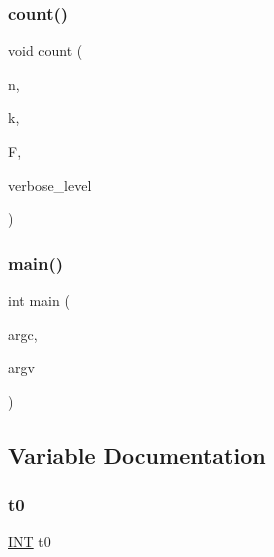 \subsubsection{\texorpdfstring{count()}{count()}}
{\footnotesize\ttfamily void count (\begin{DoxyParamCaption}\item[{\mbox{\hyperlink{galois_8h_a09fddde158a3a20bd2dcadb609de11dc}{I\+NT}}}]{n,  }\item[{\mbox{\hyperlink{galois_8h_a09fddde158a3a20bd2dcadb609de11dc}{I\+NT}}}]{k,  }\item[{\mbox{\hyperlink{classfinite__field}{finite\+\_\+field}} $\ast$}]{F,  }\item[{\mbox{\hyperlink{galois_8h_a09fddde158a3a20bd2dcadb609de11dc}{I\+NT}}}]{verbose\+\_\+level }\end{DoxyParamCaption})}

\mbox{\label{matrix__rank_8_c_a3c04138a5bfe5d72780bb7e82a18e627}} 
\subsubsection{\texorpdfstring{main()}{main()}}
{\footnotesize\ttfamily int main (\begin{DoxyParamCaption}\item[{int}]{argc,  }\item[{char $\ast$$\ast$}]{argv }\end{DoxyParamCaption})}



\subsection{Variable Documentation}
\mbox{\label{matrix__rank_8_c_a4268f4fe222ffb119218a0199f5e1904}} 
\subsubsection{\texorpdfstring{t0}{t0}}
{\footnotesize\ttfamily \mbox{\hyperlink{galois_8h_a09fddde158a3a20bd2dcadb609de11dc}{I\+NT}} t0}

